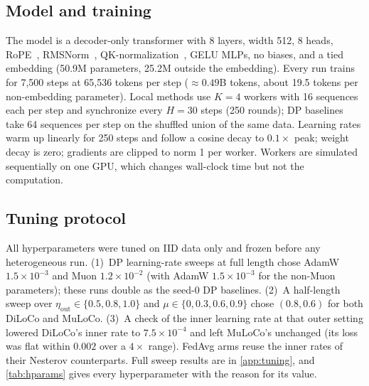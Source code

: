 \documentclass{article}
\begin{document}
\subsection{Model and training}
The model is a decoder-only transformer with 8 layers, width 512, 8 heads, RoPE~\cite{su2024roformer}, RMSNorm~\cite{zhang2019rmsnorm}, QK-normalization~\cite{henry2020qknorm}, GELU MLPs, no biases, and a tied embedding (50.9M parameters, 25.2M outside the embedding). Every run trains for 7{,}500 steps at 65{,}536 tokens per step (${\approx}0.49$B tokens, about 19.5 tokens per non-embedding parameter). Local methods use $K=4$ workers with 16 sequences each per step and synchronize every $H=30$ steps (250 rounds); DP baselines take 64 sequences per step on the shuffled union of the same data. Learning rates warm up linearly for 250 steps and follow a cosine decay to $0.1\times$ peak; weight decay is zero; gradients are clipped to norm 1 per worker. Workers are simulated sequentially on one GPU, which changes wall-clock time but not the computation.

\subsection{Tuning protocol}
All hyperparameters were tuned on IID data only and frozen before any heterogeneous run. (1)~DP learning-rate sweeps at full length chose AdamW $1.5\times10^{-3}$ and Muon $1.2\times10^{-2}$ (with AdamW $1.5\times10^{-3}$ for the non-Muon parameters); these runs double as the seed-0 DP baselines. (2)~A half-length sweep over $\eta_{\mathrm{out}} \in \{0.5, 0.8, 1.0\}$ and $\mu \in \{0, 0.3, 0.6, 0.9\}$ chose $(0.8, 0.6)$ for both DiLoCo and
MuLoCo. (3)~A check of the inner learning rate at that outer setting lowered DiLoCo's inner rate to $7.5\times10^{-4}$ and left MuLoCo's unchanged (its loss was flat within $0.002$ over a $4\times$ range). FedAvg arms reuse the inner rates of their Nesterov counterparts. Full sweep results are in \cref{app:tuning}, and \cref{tab:hparams} gives every hyperparameter with the reason for its value.
\end{document}
